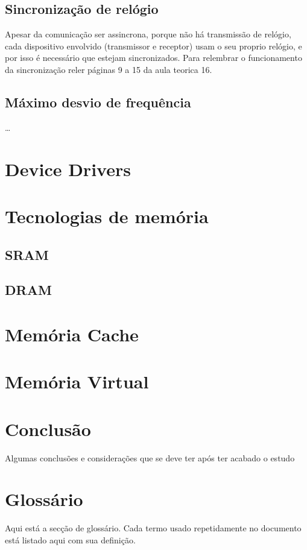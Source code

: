 \documentclass[a4paper, 12pt, onecolumn, oneside]{scrartcl}
\begin{document}
\subsection{Sincronização de relógio}
Apesar da comunicação ser assincrona, porque não há transmissão de relógio, cada dispositivo envolvido (transmissor e receptor) usam o seu proprio relógio, e por isso é necessário que 
estejam sincronizados.
Para relembrar o funcionamento da sincronização reler páginas 9 a 15 da aula teorica 16.

\subsection{Máximo desvio de frequência}
\dots

\section{Device Drivers}

\section{Tecnologias de memória}
\subsection{SRAM}
\subsection{DRAM}

\section{Memória Cache}

\section{Memória Virtual}

\section{Conclusão}
Algumas conclusões e considerações que se deve ter após
ter acabado o estudo

\clearpage
\section{Glossário}\label{glossary}

Aqui está a secção de glossário. Cada termo usado repetidamente no documento está listado aqui com sua definição.
\end{document}
